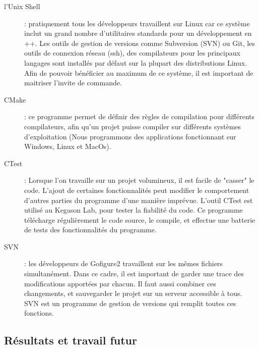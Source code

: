 \begin{description}
  \item[l'Unix Shell] : pratiquement tous les développeurs travaillent sur Linux
  car ce système inclut un grand nombre d'utilitaires
  standards pour un développement en {\C++}.
  Les outils de gestion de versions comme Subversion (SVN) ou Git, les outils de connexion réseau (ssh),
  des compilateurs pour les principaux langages sont installés par défaut sur la
  plupart des distributions Linux.
  Afin de pouvoir bénéficier au maximum de ce système, il est important de maitriser
  l'invite de commande.
  \item[CMake] : ce programme permet de définir des règles de compilation pour différents compilateurs, afin qu'un projet puisse
   compiler sur différents systèmes d'exploitation (Nous programmons des applications fonctionnant sur Windows, Linux et MacOs).
  \item[CTest] : Lorsque l'on travaille sur un projet volumineux, il est facile de "casser" le code. L'ajout de certaines fonctionnalités 
  peut modifier le comportement d'autres parties du programme d'une manière imprévue. L'outil CTest est utilisé au Kegason Lab, 
  pour tester la fiabilité du code. Ce programme télécharge régulièrement le code source, le compile, et effectue une batterie de tests
  des fonctionnalités du programme.
  \item[SVN] : les développeurs de Gofigure2 travaillent sur les mêmes fichiers simultanément. 
  Dans ce cadre, il est important de garder une trace des modifications apportées par chacun. Il faut aussi combiner ces changements, 
  et sauvegarder le projet sur un serveur accessible à tous. SVN est un programme de gestion de versions qui remplit toutes ces 
  fonctions.
\end{description}


\subsection{Résultats et travail futur}

